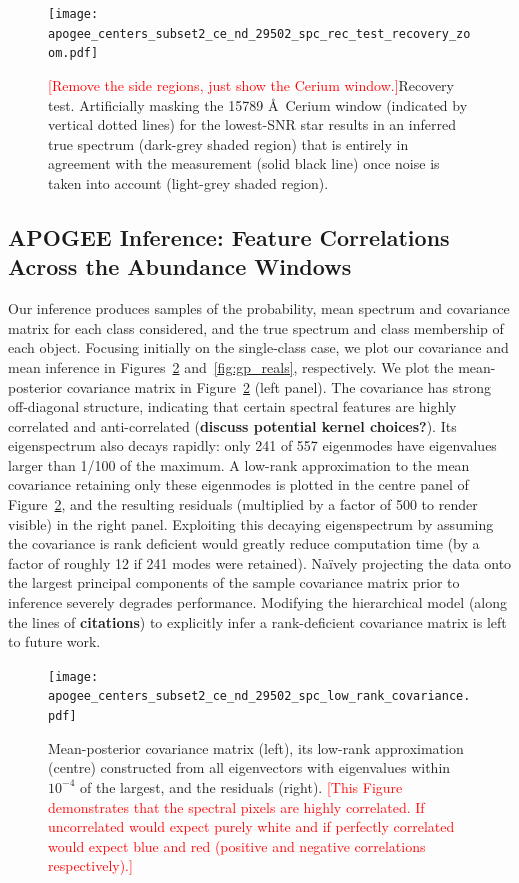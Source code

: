 \documentclass[a4paper,fleqn,usenatbib]{mnras}
\begin{document}
\begin{figure}
	\texttt{[image: apogee\_centers\_subset2\_ce\_nd\_29502\_spc\_rec\_test\_recovery\_zoom.pdf]}
    \caption{\textcolor{red}{[Remove the side regions, just show the Cerium window.]}Recovery test. Artificially masking the 15789 \AA\ Cerium window (indicated by vertical dotted lines) for the lowest-SNR star results in an inferred true spectrum (dark-grey shaded region) that is entirely in agreement with the measurement (solid black line) once noise is taken into account (light-grey shaded region).}
    \label{fig:recovery_test}
\end{figure}

\subsection{APOGEE Inference: Feature Correlations Across the Abundance Windows}


Our inference produces samples of the probability, mean spectrum and covariance matrix for each class considered, and the true spectrum and class membership of each object. Focusing initially on the single-class case, we plot our covariance and mean inference in Figures~\ref{fig:inferred_cov} and~\ref{fig:gp_reals}, respectively. We plot the mean-posterior covariance matrix in Figure~\ref{fig:inferred_cov} (left panel). The covariance has strong off-diagonal structure, indicating that certain spectral features are highly correlated and anti-correlated ({\bf discuss potential kernel choices?}). Its eigenspectrum also decays rapidly: only 241 of 557 eigenmodes have eigenvalues larger than 1/100 of the maximum. A low-rank approximation to the mean covariance retaining only these eigenmodes is plotted in the centre panel of Figure~\ref{fig:inferred_cov}, and the resulting residuals (multiplied by a factor of 500 to render visible) in the right panel. Exploiting this decaying eigenspectrum by assuming the covariance is rank deficient would greatly reduce computation time (by a factor of roughly 12 if 241 modes were retained). Na\"ively projecting the data onto the largest principal components of the sample covariance matrix prior to inference severely degrades performance. Modifying the hierarchical model (along the lines of {\bf citations}) to explicitly infer a rank-deficient covariance matrix is left to future work.

\begin{figure}
	\texttt{[image: apogee\_centers\_subset2\_ce\_nd\_29502\_spc\_low\_rank\_covariance.pdf]}
    \caption{Mean-posterior covariance matrix (left), its low-rank approximation (centre) constructed from all eigenvectors with eigenvalues within $10^{-4}$ of the largest, and the residuals (right). \textcolor{red}{[This Figure demonstrates that the spectral pixels are highly correlated. If uncorrelated would expect purely white and if perfectly correlated would expect blue and red (positive and negative correlations respectively).]}}
    \label{fig:inferred_cov}
\end{figure}
\end{document}
